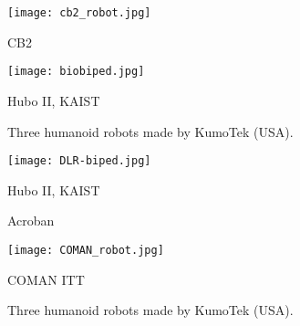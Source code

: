 \begin{figure}[]
    \begin{center}
        \texttt{[image: cb2\_robot.jpg]}
    \end{center}
    \caption{CB2}
    \label{fig:cb2_robot}
\end{figure}

\begin{figure}[]
    \begin{center}
        \texttt{[image: biobiped.jpg]}
    \end{center}
    \caption{Hubo II, KAIST}
    \label{fig:biobiped_robot}
\end{figure}


\begin{figure}[]
\centering
    \hfil
    \hfil
    \caption{Three humanoid robots made by KumoTek (USA).}
    \label{fig:delft_passive_robots}
\end{figure}

\begin{figure}[]
    \begin{center}
        \texttt{[image: DLR-biped.jpg]}
    \end{center}
    \caption{Hubo II, KAIST}
    \label{fig:DLR-robot}
\end{figure}

\begin{figure}[]
\centering
    \hfil
    \hfil
    \caption{Acroban}
    \label{fig:acroban_robot}
\end{figure}


\begin{figure}[]
    \begin{center}
        \texttt{[image: COMAN\_robot.jpg]}
    \end{center}
    \caption{COMAN ITT}
    \label{fig:coman-robot}
\end{figure}

\begin{figure}[]
\centering
    \hfil
    \caption{Three humanoid robots made by KumoTek (USA).}
    \label{fig:petman_robot}
\end{figure}

